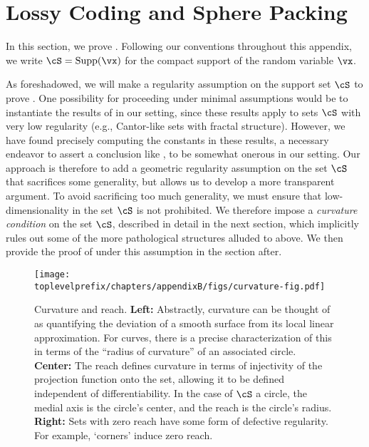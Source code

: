 \documentclass[../../book-main.tex]{subfiles}
\begin{document}
\section{Lossy Coding and Sphere Packing}\label{app:rate-distortion-covering}

In this section, we prove .
Following our conventions throughout this appendix, we write $\cS = \Supp(\vx)$
for the compact support of the random variable $\vx$.

As foreshadowed, we will make a regularity assumption on the support set $\cS$
to prove . One possibility for
proceeding under minimal assumptions would be to instantiate the results of
\cite{Riegler2018-jh,Riegler2023-rr} in our setting, since these results apply
to sets $\cS$ with very low regularity (e.g., Cantor-like sets with fractal
structure). However, we have found precisely computing the constants in these
results, a necessary endeavor to assert a conclusion like
, to be somewhat onerous in our
setting. Our approach is therefore to add a geometric regularity assumption on
the set $\cS$ that sacrifices some generality, but allows us to develop
a more transparent argument. To avoid sacrificing too much generality, we must
ensure that low-dimensionality in the set $\cS$ is not prohibited. We therefore
impose a \textit{curvature condition} on the set $\cS$, described in detail in
the next section, which implicitly rules out some of the more pathological
structures alluded to above. We then provide the proof of
 under this assumption in the section
after.

\begin{figure}[t]
    \centering
    \texttt{[image: \\toplevelprefix/chapters/appendixB/figs/curvature-fig.pdf]}

    \caption{Curvature and reach. \textbf{Left:} Abstractly, curvature can be
    thought of as quantifying the deviation of a smooth surface from its local
    linear approximation. For curves, there is a precise characterization of
    this in terms of the ``radius of curvature'' of an associated circle.
    \textbf{Center:} The reach defines curvature in terms of injectivity of the
    projection function onto the set, allowing it to be defined independent of
    differentiability. In the case of $\cS$ a circle, the medial axis is the
    circle's center, and the reach is the circle's radius. \textbf{Right:} Sets
    with zero reach have some form of defective regularity. For example,
    `corners' induce zero reach.}
    \label{fig:curvature-reach}
\end{figure}
\end{document}
